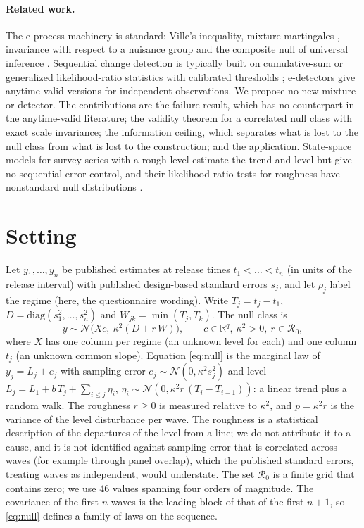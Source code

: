 \documentclass[11pt]{article}
\theoremstyle{plain}
\theoremstyle{definition}
\begin{document}
\paragraph{Related work.} The e-process machinery is standard: Ville's inequality, mixture martingales \citep{robbins1970}, invariance with respect to a nuisance group \citep{perezortiz2024} and the composite null of universal inference \citep{wasserman2020,ruf2023}. Sequential change detection is typically built on cumulative-sum or generalized likelihood-ratio statistics with calibrated thresholds \citep{page1954,siegmund1995,lorden2005}; e-detectors \citep{shin2024} give anytime-valid versions for independent observations. We propose no new mixture or detector. The contributions are the failure result, which has no counterpart in the anytime-valid literature; the validity theorem for a correlated null class with exact scale invariance; the information ceiling, which separates what is lost to the null class from what is lost to the construction; and the application. State-space models for survey series with a rough level \citep{scott1974,durbin2012,harvey2000} estimate the trend and level but give no sequential error control, and their likelihood-ratio tests for roughness have nonstandard null distributions \citep{self1987}.

\section{Setting}
\label{sec:setting}

Let $y_1, \dots, y_n$ be published estimates at release times $t_1 < \dots < t_n$ (in units of the release interval) with published design-based standard errors $s_j$, and let $\rho_j$ label the regime (here, the questionnaire wording). Write $T_j = t_j - t_1$, $D = \mathrm{diag}(s_1^2, \dots, s_n^2)$ and $W_{jk} = \min(T_j, T_k)$. The null class is
\begin{equation}
y \sim \mathcal{N}\big(X c,\ \kappa^2 (D + r\,W)\big), \qquad c \in \mathbb{R}^{q},\ \kappa^2 > 0,\ r \in \mathcal{R}_0,
\label{eq:null}
\end{equation}
where $X$ has one column per regime (an unknown level for each) and one column $t_j$ (an unknown common slope). Equation \eqref{eq:null} is the marginal law of $y_j = L_j + e_j$ with sampling error $e_j \sim \mathcal{N}(0, \kappa^2 s_j^2)$ and level $L_j = L_1 + b\,T_j + \sum_{i \le j} \eta_i$, $\eta_i \sim \mathcal{N}(0, \kappa^2 r\,(T_i - T_{i-1}))$: a linear trend plus a random walk. The roughness $r \ge 0$ is measured relative to $\kappa^2$, and $p = \kappa^2 r$ is the variance of the level disturbance per wave. The roughness is a statistical description of the departures of the level from a line; we do not attribute it to a cause, and it is not identified against sampling error that is correlated across waves (for example through panel overlap), which the published standard errors, treating waves as independent, would understate. The set $\mathcal{R}_0$ is a finite grid that contains zero; we use 46 values spanning four orders of magnitude. The covariance of the first $n$ waves is the leading block of that of the first $n+1$, so \eqref{eq:null} defines a family of laws on the sequence.
\end{document}
